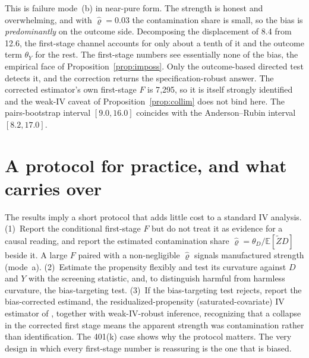 \documentclass[11pt]{article}
\theoremstyle{plain}
\theoremstyle{definition}
\newcommand{\E}{\mathbb{E}}
\newcommand{\Zt}{\tilde{Z}}
\begin{document}
This is failure mode~(b) in near-pure form. The strength is honest and overwhelming, and with $\hat\varrho=0.03$ the contamination share is small, so the bias is \emph{predominantly} on the outcome side. Decomposing the displacement of 8.4 from 12.6, the first-stage channel accounts for only about a tenth of it and the outcome term $\theta_Y$ for the rest. The first-stage numbers see essentially none of the bias, the empirical face of Proposition~\ref{prop:imposs}. Only the outcome-based directed test detects it, and the correction returns the specification-robust answer. The corrected estimator's own first-stage $F$ is 7{,}295, so it is itself strongly identified and the weak-IV caveat of Proposition~\ref{prop:collim} does not bind here. The pairs-bootstrap interval $[9.0,16.0]$ coincides with the Anderson--Rubin interval $[8.2,17.0]$.

\section{A protocol for practice, and what carries over}\label{sec:headtohead}

The results imply a short protocol that adds little cost to a standard IV analysis. (1)~Report the conditional first-stage $F$ but do not treat it as evidence for a causal reading, and report the estimated contamination share $\hat\varrho=\theta_D/\E[\Zt D]$ beside it. A large $F$ paired with a non-negligible $\hat\varrho$ signals manufactured strength (mode~a). (2)~Estimate the propensity flexibly and test its curvature against $D$ and $Y$ with the screening statistic, and, to distinguish harmful from harmless curvature, the bias-targeting test. (3)~If the bias-targeting test rejects, report the bias-corrected estimand, the residualized-propensity (saturated-covariate) IV estimator of \citet{blandhol2022}, together with weak-IV-robust inference, recognizing that a collapse in the corrected first stage means the apparent strength was contamination rather than identification. The 401(k) case shows why the protocol matters. The very design in which every first-stage number is reassuring is the one that is biased.
\end{document}
